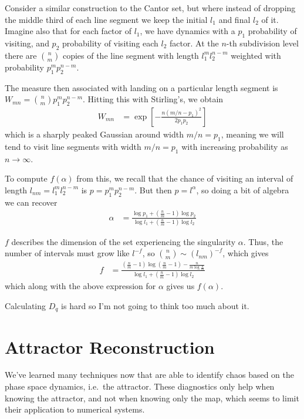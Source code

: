 \documentclass[10pt]{article}
\begin{document}
Consider a similar construction to the Cantor set, but where instead of dropping
the middle third of each line segment we keep the initial $l_1$ and final $l_2$
of it. Imagine also that for each factor of $l_1$, we have dynamics with a $p_1$
probability of visiting, and $p_2$ probability of visiting each $l_2$ factor. At
the $n$-th subdivision level there are $\binom{n}{m}$ copies of the line segment
with length $l_1^ml_2^{n-m}$ weighted with probability $p_1^m p_2^{n-m}$.

The measure then associated with landing on a particular length segment is
$W_{mn} = \binom{n}{m}p_1^mp_2^{n-m}$. Hitting this with Stirling's, we obtain
\begin{align}
    W_{mn} &= \exp\left[ -\frac{n(m/n - p_1)^2}{2p_1p_2} \right]
\end{align}
which is a sharply peaked Gaussian around width $m/n = p_1$, meaning we will
tend to visit line segments with width $m/n = p_1$ with increasing probability
as $n \to \infty$.

To compute $f(\alpha)$ from this, we recall that the chance of visiting an
interval of length $l_{nm} = l_1^ml_2^{n-m}$ is $p = p_1^mp_2^{n-m}$. But then
$p = l^\alpha$, so doing a bit of algebra we can recover
\begin{align}
    \alpha &= \frac{\log p_1 + \left( \frac{n}{m} - 1 \right)\log p_2}
        {\log l_1 + \left( \frac{n}{m} - 1 \right)\log l_2}
\end{align}

$f$ describes the dimension of the set experiencing the singularity $\alpha$.
Thus, the number of intervals must grow like $l^{-f}$, so
$\binom{n}{m} \sim \left( l_{nm} \right)^{-f}$, which gives
\begin{align}
    f &= \frac{\left( \frac{n}{m} - 1 \right)\log \left( \frac{n}{m} - 1 \right)
        - \frac{n}{m\log \frac{n}{m}}}{\log l_1 + \left( \frac{n}{m} - 1 \right)
        \log l_2}
\end{align}
which along with the above expression for $\alpha$ gives us $f(\alpha)$.

Calculating $D_q$ is hard so I'm not going to think too much about it.

\clearpage

\section{Attractor Reconstruction}

We've learned many techniques now that are able to identify chaos based on the
phase space dynamics, i.e.\ the attractor. These diagnostics only help when
knowing the attractor, and not when knowing only the map, which seems to limit
their application to numerical systems.
\end{document}
